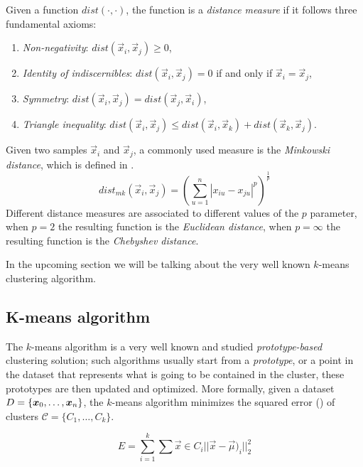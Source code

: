 Given a function $dist(\cdot, \cdot)$, the function is a \emph{distance measure} if it follows three
fundamental axioms:
\begin{enumerate}
	\item \emph{Non-negativity}: $dist(\vec{x}_i, \vec{x}_j) \geq 0$,
	\item \emph{Identity of indiscernibles}: $dist(\vec{x}_i, \vec{x}_j) = 0$ if and only if
		$\vec{x}_i = \vec{x}_j$,
	\item \emph{Symmetry}: $dist(\vec{x}_i, \vec{x}_j) = dist(\vec{x}_j, \vec{x}_i)$,
	\item \emph{Triangle inequality}: $dist(\vec{x}_i, \vec{x}_j) \leq dist(\vec{x}_i,
		\vec{x}_k) + dist(\vec{x}_k, \vec{x}_j)$.
\end{enumerate}
Given two samples $\vec{x}_i$ and $\vec{x}_j$, a commonly used measure is the \emph{Minkowski
distance}, which is defined in .
\begin{equation}
	\label{eq:mkd}
	dist_{mk}(\vec{x}_i, \vec{x}_j) = \left(\sum_{u = 1}^n|x_{iu} - x_{ju}|^p\right)^\frac{1}{p}
\end{equation}
Different distance measures are associated to different values of the $p$ parameter, when $p = 2$
the resulting function is the \emph{Euclidean distance}, when $p = \infty$ the resulting function is
the \emph{Chebyshev distance}.

In the upcoming section we will be talking about the very well known $k$-means clustering algorithm.

\subsection{K-means algorithm}
The $k$-means algorithm \cite{macqueen1967} \cite{lloyd1982} is a very well known and studied
\emph{prototype-based} clustering solution; such algorithms usually start from a \emph{prototype},
or a point in the dataset that represents what is going to be contained in the cluster, these
prototypes are then updated and optimized. More formally, given a dataset $D = \{\boldsymbol{x}_0, \ldots, \boldsymbol{x}_n\}$, the $k$-means
algorithm minimizes the squared error () of clusters $\mathcal{C} = \{C_1,
\ldots, C_k\}$.

\begin{equation}
	\label{eq:squared-error}
	E = \sum_{i = 1}^k\sum{\vec{x} \in C_i}||\vec{x} - \vec{\mu})_i||_2^2
\end{equation}


